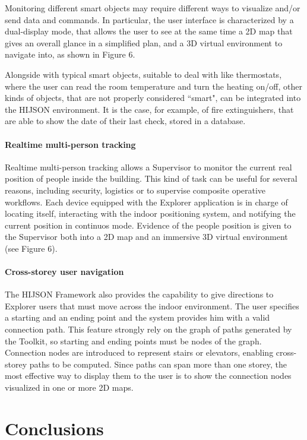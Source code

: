 \documentclass{sig-alternate}
\begin{document}
Monitoring different smart objects may require different ways to visualize
and/or send data and commands. In particular, the user interface is
characterized by a dual-display mode, that allows the user to see at the same
time a 2D map that gives an overall glance in a simplified plan, and a 3D
virtual environment to navigate into, as shown in Figure 6.

Alongside with typical smart objects, suitable to deal with like thermostats,
where the user can read the room temperature and turn the heating on/off,
other kinds of objects, that are not properly considered ``smart", can be
integrated into the HIJSON environment. It is the case, for example, of fire
extinguishers, that are able to show the date of their last check, stored in a
database.

\paragraph{Realtime multi-person tracking} Realtime multi-person tracking
allows a Supervisor to monitor the current real position of people inside the
building. This kind of task can be useful for several reasons, including
security, logistics or to supervise composite operative workflows. Each device
equipped with the Explorer application is in charge of locating itself,
interacting with the indoor positioning system, and notifying the current
position in continuos mode. Evidence of the people position is given to the
Supervisor both into a 2D map and an immersive 3D virtual environment (see
Figure 6).

\paragraph{Cross-storey user navigation} The HIJSON Framework also provides
the capability to give directions to Explorer users that must move across the
indoor environment. The user specifies a starting and an ending point and the
system provides him with a valid connection path. This feature strongly rely
on the graph of paths generated by the Toolkit, so starting and ending points
must be nodes of the graph. Connection nodes are introduced to represent
stairs or elevators, enabling cross-storey paths to be computed. Since paths
can span more than one storey, the most effective way to display them to the
user is to show the connection nodes visualized in one or more 2D maps.


\section{Conclusions}
\end{document}
